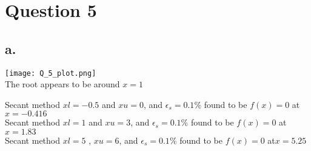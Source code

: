 \documentclass[11pt]{article} %
\begin{document}
\clearpage

\section*{Question 5}

\subsection*{a.}

\begin{center}
	\texttt{[image: Q\_5\_plot.png]} \\
	The root appears to be around $x=1$
\end{center}

\begin{flushleft}
	Secant method $xl = -0.5$ and $xu = 0$, and $\epsilon_s = 0.1\%$ found to be $ f(x) = 0$ at {\boldmath$x = -0.416$} \\
	Secant method $xl = 1$ and $xu = 3$, and $\epsilon_s = 0.1\%$ found to be $ f(x) = 0$ at {\boldmath$x = 1.83$} \\
	Secant method $xl = 5$ , $xu = 6$, and $\epsilon_s = 0.1\%$  found to be $ f(x) = 0$ at{\boldmath$x = 5.25$} 
\end{flushleft}
\end{document}
